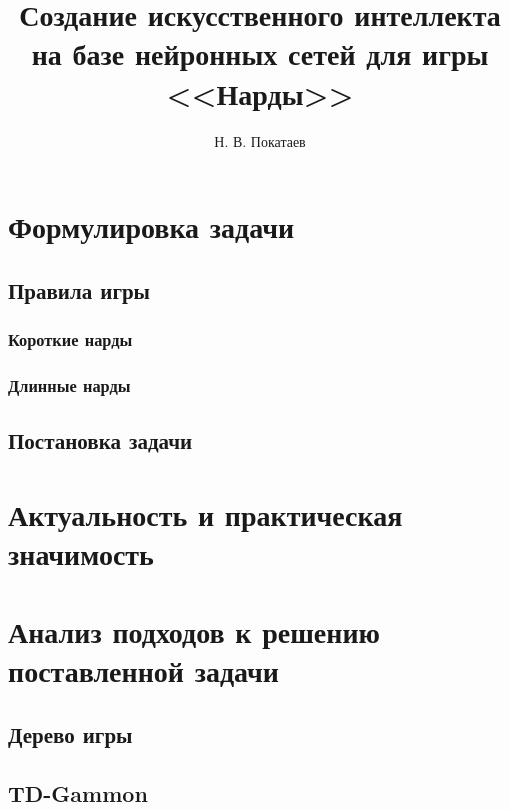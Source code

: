 \documentclass{vsciwork}
\title{Создание искусственного интеллекта на базе нейронных сетей для игры <<Нарды>>}
\author{Н. В. Покатаев}
\begin{document}
\maketitle

\tableofcontents



\section{Формулировка задачи}


\subsection{Правила игры}


\subsubsection{Короткие нарды}


\subsubsection{Длинные нарды}


\subsection{Постановка задачи}


\section{Актуальность и практическая значимость}


\section{Анализ подходов к решению поставленной задачи}

\subsection{Дерево игры}


\subsection{TD-Gammon}





\end{document}
